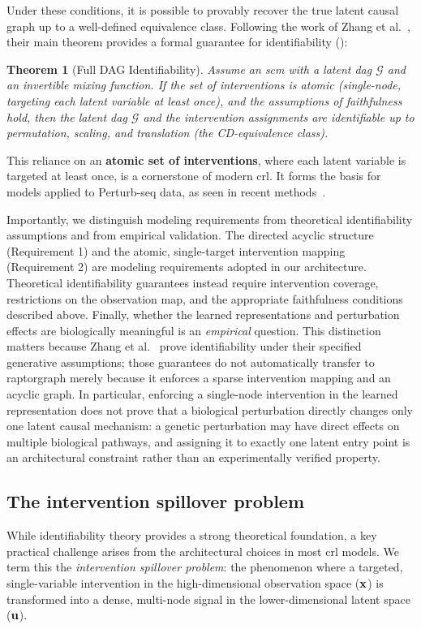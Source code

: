 \documentclass[10pt,letterpaper]{article}
\def\gG{{\mathcal{G}}}\def\gH{{\mathcal{H}}}\def\gI{{\mathcal{I}}}
\newtheorem{theorem}{Theorem}
\theoremstyle{definition}
\theoremstyle{remark}
\newcommand{\variables}{\rvx}
\newcommand{\graph}{\gG}
\newcommand{\latentcausalvars}{\rvu}
\begin{document}
Under these conditions, it is possible to provably recover the true latent causal graph up to a well-defined equivalence class.
Following the work of Zhang et al.~\cite{zhang2023identifiability}, their main theorem provides a formal guarantee for identifiability ():

\begin{theorem}[Full DAG Identifiability]\label{thm:zhang_full_dag}
Assume an \gls{scm} with a latent \gls{dag} $\graph$ and an invertible mixing function.
If the set of interventions is atomic (single-node, targeting each latent variable at least once), and the assumptions of faithfulness hold, then the latent \gls{dag} $\graph$ and the intervention assignments are identifiable up to permutation, scaling, and translation (the CD-equivalence class).
\end{theorem}

This reliance on an \textbf{atomic set of interventions}, where each latent variable is targeted at least once, is a cornerstone of modern \gls{crl}.
It forms the basis for models applied to Perturb-seq data, as seen in recent methods~\cite{zhang2023identifiability,de2025interpretable}.

Importantly, we distinguish modeling requirements from theoretical identifiability assumptions and from empirical validation.
The directed acyclic structure (Requirement 1) and the atomic, single-target intervention mapping (Requirement 2) are modeling requirements adopted in our architecture.
Theoretical identifiability guarantees instead require intervention coverage, restrictions on the observation map, and the appropriate faithfulness conditions described above.
Finally, whether the learned representations and perturbation effects are biologically meaningful is an \emph{empirical} question.
This distinction matters because Zhang et al.~\cite{zhang2023identifiability} prove identifiability under their specified generative assumptions; those guarantees do not automatically transfer to \gls{raptorgraph} merely because it enforces a sparse intervention mapping and an acyclic graph.
In particular, enforcing a single-node intervention in the learned representation does not prove that a biological perturbation directly changes only one latent causal mechanism: a genetic perturbation may have direct effects on multiple biological pathways, and assigning it to exactly one latent entry point is an architectural constraint rather than an experimentally verified property.

\subsection*{The intervention spillover problem}
While identifiability theory provides a strong theoretical foundation, a key practical challenge arises from the architectural choices in most \gls{crl} models.
We term this the \emph{intervention spillover problem}: the phenomenon where a targeted, single-variable intervention in the high-dimensional observation space ($\variables$) is transformed into a dense, multi-node signal in the lower-dimensional latent space ($\latentcausalvars$).
\end{document}
